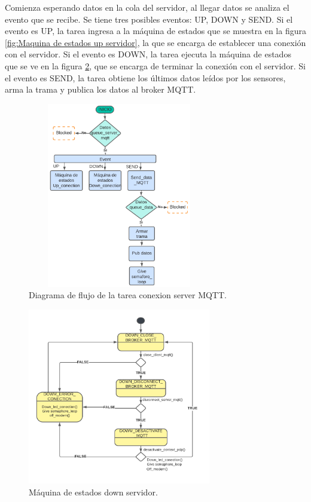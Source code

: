 Comienza esperando datos en la cola del servidor, al llegar datos se analiza el evento que se recibe. Se tiene tres posibles eventos: UP, DOWN y SEND. Si el evento es UP, la tarea ingresa a la máquina de estados que se muestra en la figura \ref{fig:Maquina de estados up servidor}, la que se encarga de establecer una conexión con el servidor. Si el evento es DOWN, la tarea ejecuta la máquina de estados que se ve en la figura \ref{fig:Maquina de estados dowm servidor}, que se encarga de terminar la conexión con el servidor. Si el evento es SEND, la tarea obtiene los últimos datos leídos por los sensores, arma la trama y publica los datos al broker MQTT. 
\begin{figure}[h]
  \centering
	\includegraphics[width=8cm, height=8.1cm]{./Figures/DF general task conection.png}
	\caption{Diagrama de flujo de la tarea conexion server MQTT.}
	\label{fig:Df tarea conexion}
\end{figure}

\begin{figure}[h]
  \centering
  \includegraphics[width=8cm, height=7.7cm]{./Figures/SM down server.png}
  \caption{Máquina de estados down servidor.}
  \label{fig:Maquina de estados dowm servidor}
\end{figure}
\clearpage

